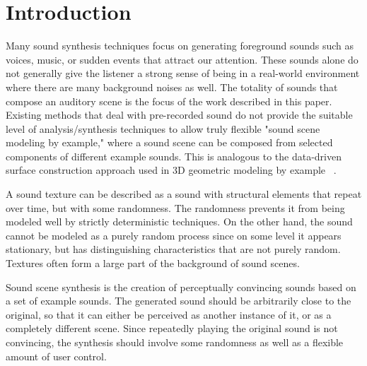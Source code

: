 \documentclass{acmsiggraph}               %
\begin{document}


\keywordlist

\section{Introduction}
Many sound synthesis techniques focus on generating foreground sounds 
such as voices, music, or sudden events that attract our attention. 
These sounds alone do not generally give the listener a strong sense of 
being in a real-world environment where there are many background noises as 
well. The totality of sounds that compose an auditory scene is the focus 
of the work described in this paper.  Existing methods that deal with 
pre-recorded sound do not provide the suitable level of 
analysis/synthesis techniques to allow truly flexible "sound scene 
modeling by example," where a sound scene can be composed from selected 
components of different example sounds. This is analogous to the 
data-driven surface construction approach used in 3D geometric modeling 
by example  ~\cite{Funkhouser04}. 

A sound texture can be described as a sound with structural elements 
that repeat over time, but with some randomness. The randomness prevents 
it from being modeled well by strictly deterministic techniques. On the 
other hand, the sound cannot be modeled as a purely random process since 
on some level it appears stationary, but has distinguishing 
characteristics that are not purely random. Textures often form a large 
part of the background of sound scenes.

Sound scene synthesis is the creation of perceptually convincing sounds 
based on a set of example sounds. The generated sound should be 
arbitrarily close to the original, so that it can either be perceived as 
another instance of it, or as a completely different scene. Since 
repeatedly playing the original sound is not convincing, the synthesis 
should involve some randomness as well as a flexible amount of user control. 
\end{document}
